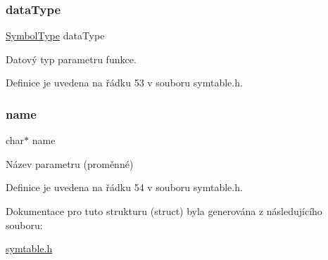 \subsubsection{\texorpdfstring{data\+Type}{dataType}}
{\footnotesize\ttfamily \hyperlink{symtable_8h_a623952f6aa67a355a3840e25272b1c91}{Symbol\+Type} data\+Type}



Datový typ parametru funkce. 



Definice je uvedena na řádku 53 v souboru symtable.\+h.

\mbox{\label{struct_s___symbol_info___function___parameter_a5ac083a645d964373f022d03df4849c8}} 
\subsubsection{\texorpdfstring{name}{name}}
{\footnotesize\ttfamily char$\ast$ name}



Název parametru (proměnné) 



Definice je uvedena na řádku 54 v souboru symtable.\+h.



Dokumentace pro tuto strukturu (struct) byla generována z následujícího souboru\+:\begin{DoxyCompactItemize}
\item 
\hyperlink{symtable_8h}{symtable.\+h}\end{DoxyCompactItemize}
